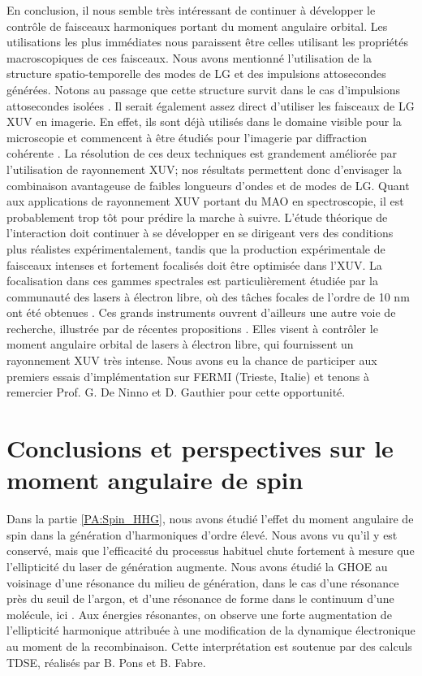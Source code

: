 En conclusion, il nous semble très intéressant de continuer à développer le contrôle de faisceaux harmoniques portant du moment angulaire orbital. Les utilisations les plus immédiates nous paraissent être celles utilisant les propriétés macroscopiques de ces faisceaux. Nous avons mentionné l'utilisation de la structure spatio-temporelle des modes de LG et des impulsions attosecondes générées. Notons au passage que cette structure survit dans le cas d'impulsions attosecondes isolées . Il serait également assez direct d'utiliser les faisceaux de LG XUV en imagerie. En effet, ils sont déjà utilisés dans le domaine visible pour la microscopie  et commencent à être étudiés pour l'imagerie par diffraction cohérente . La résolution de ces deux techniques est grandement améliorée par l'utilisation de rayonnement XUV; nos résultats permettent donc d'envisager la combinaison avantageuse de faibles longueurs d'ondes et de modes de LG. \linebreak
Quant aux applications de rayonnement XUV portant du MAO en spectroscopie, il est probablement trop tôt pour prédire la marche à suivre. L'étude théorique de l'interaction doit continuer à se développer en se dirigeant vers des conditions plus réalistes expérimentalement, tandis que la production expérimentale de faisceaux intenses et fortement focalisés doit être optimisée dans l'XUV. La focalisation dans ces gammes spectrales est particulièrement étudiée par la communauté des lasers à électron libre, où des tâches focales de l'ordre de 10 nm ont été obtenues . Ces grands instruments ouvrent d'ailleurs une autre voie de recherche, illustrée par de récentes propositions . Elles visent à contrôler le moment angulaire orbital de lasers à électron libre, qui fournissent un rayonnement XUV très intense. Nous avons eu la chance de participer aux premiers essais d'implémentation sur FERMI (Trieste, Italie) et tenons à remercier Prof. G. De Ninno et D. Gauthier pour cette opportunité.

\section{Conclusions et perspectives sur le moment angulaire de spin}
Dans la partie \ref{PA:Spin_HHG}, nous avons étudié l'effet du moment angulaire de spin dans la génération d'harmoniques d'ordre élevé. Nous avons vu qu'il y est conservé, mais que l'efficacité du processus habituel chute fortement à mesure que l'ellipticité du laser de génération augmente. Nous avons étudié la GHOE au voisinage d'une résonance du milieu de génération, dans le cas d'une résonance près du seuil de l'argon, et d'une résonance de forme dans le continuum d'une molécule, ici . Aux énergies résonantes, on observe une forte augmentation de l'ellipticité harmonique attribuée à une modification de la dynamique électronique au moment de la recombinaison. Cette interprétation est soutenue par des calculs TDSE, réalisés par B. Pons et B. Fabre. 

